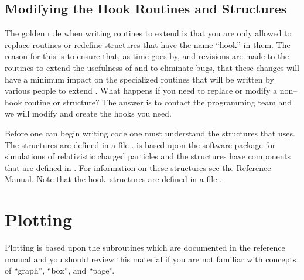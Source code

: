 \section{Modifying the Hook Routines and Structures}

The golden rule when writing routines to extend \tao is that you are
only allowed to replace routines or redefine structures that have the
name ``hook'' in them. The reason for this is to ensure that, as time
goes by, and revisions are made to the \tao routines to extend the
usefulness of \tao and to eliminate bugs, that these changes will
have a minimum impact on the specialized routines that will be written
by various people to extend \tao.  What happens if you need to replace
or modify a non--hook routine or structure?  The answer is to contact
the \tao programming team and we will modify \tao and create the hooks 
you need.

Before one can begin writing code one must understand the structures
that \tao uses. The structures are defined in a file
.  \tao is based upon the \bmad software
package for simulations of relativistic charged particles and the
\tao structures have components that are defined in \bmad. For
information on these structures see the \bmad Reference Manual. Note
that the hook--structures are defined in a file .

\chapter{Plotting}
\label{s:prog_plotting} 

Plotting is based upon the  subroutines which are
documented in the \bmad reference manual and you should review this
material if you are not familiar with concepts of ``graph'', ``box'',
and ``page''. 


